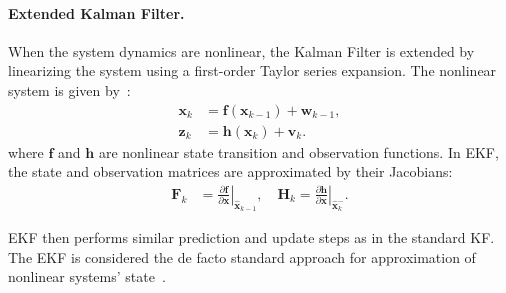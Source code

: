 \paragraph{Extended Kalman Filter.} When the system dynamics are nonlinear, the Kalman Filter is extended by linearizing the system using a first-order Taylor series expansion. The nonlinear system is given by~\cite{wiley_kalman}:
\begin{align}
    \mathbf{x}_k &= \bm{f}(\mathbf{x}_{k-1}) + \mathbf{w}_{k-1}, \\
    \mathbf{z}_k &= \bm{h}(\mathbf{x}_k) + \mathbf{v}_k.
\end{align}
where $\bm{f}$ and $\bm{h}$ are nonlinear state transition and observation functions. In EKF, the state and observation matrices are approximated by their Jacobians:
\begin{align}
    \mathbf{F}_{k} &= \left.\frac{\partial \bm{f}}{\partial \mathbf{x}}\right|_{\hat{\mathbf{x}}_{k-1}} , \quad
    \mathbf{H}_k = \left.\frac{\partial \bm{h}}{\partial \mathbf{x}}\right|_{\hat{\mathbf{x}}_k^-}.
\end{align}

EKF then performs similar prediction and update steps as in the standard KF. The EKF is considered the de facto standard approach for approximation of nonlinear systems' state~\cite{julier2004unscented}.



